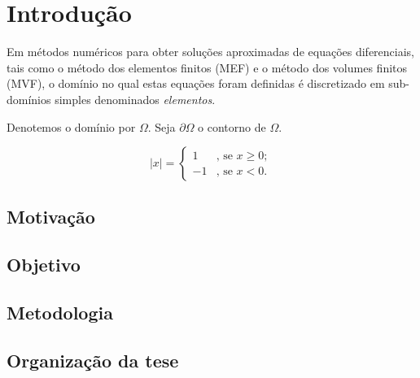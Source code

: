 \chapter{Introdução}

Em métodos numéricos para obter soluções aproximadas de equações diferenciais,
tais como o método dos elementos finitos (MEF) e o método dos volumes finitos (MVF), o domínio no qual estas equações foram definidas é discretizado em
sub-domínios simples denominados \textit{elementos}.

Denotemos o domínio por $\Omega$. Seja $\partial \Omega$ o contorno de
$\Omega$.

\begin{equation}
	|x| = \left\{ \begin{array}{ll}
	1 & \mbox{, se } x \geq 0; \\
	-1 & \mbox{, se } x < 0. \end{array} \right.
\end{equation}



\section{Motivaç{\~ a}o}

\section{Objetivo}

\section{Metodologia}

\section{Organizaç{\~ a}o da tese}
